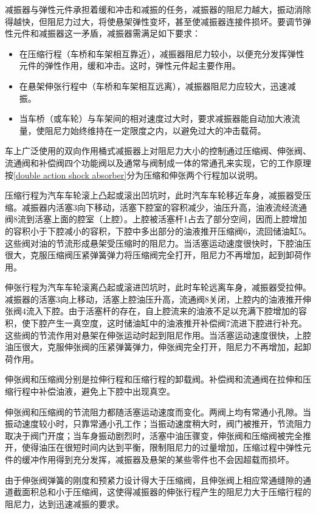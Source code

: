 \documentclass[UTF8]{ctexart}
\numberwithin{figure}{section}
\numberwithin{table}{section}
\begin{document}
减振器与弹性元件承担着缓和冲击和减振的任务，减振器的阻尼力越大，振动消除得越快，但阻尼力过大，将使悬架弹性变坏，甚至使减振器连接件损坏。要调节弹性元件和减振器这一矛盾，减振器需满足如下要求：
\begin{itemize}
	\item 在压缩行程（车桥和车架相互靠近），减振器阻尼力较小，以便充分发挥弹性元件的弹性作用，缓和冲击。这时，弹性元件起主要作用。
	\item 在悬架伸张行程中（车桥和车架相互远离），减振器阻尼力应较大，迅速减振。
	\item 当车桥（或车轮）与车架间的相对速度过大时，要求减振器能自动加大液流量，使阻尼力始终维持在一定限度之内，以避免过大的冲击载荷。
\end{itemize}

车上广泛使用的双向作用桶式减振器上对阻尼力大小的控制通过压缩阀、伸张阀、流通阀和补偿阀四个功能阀以及通常与阀制成一体的常通孔来实现，它的工作原理按\cref{double action shock absorber}分为压缩和伸张两个行程加以说明。

压缩行程为汽车车轮滚上凸起或滚出凹坑时，此时汽车车轮移近车身，减振器受压缩。减振器内活塞3向下移动，活塞下腔室的容积减少，油压升高，油液流经流通阀8流到活塞上面的腔室（上腔）。上腔被活塞杆1占去了部分空间，因而上腔增加的容积小于下腔减小的容积，下腔中多出部分的油液推开压缩阀6，流回储油缸5。这些阀对油的节流形成悬架受压缩时的阻尼力。当活塞运动速度很快时，下腔油压很大，克服压缩阀压紧弹簧弹力将压缩阀完全打开，阻尼力不再增加，起到卸荷作用。

伸张行程为汽车车轮滚离凸起或滚进凹坑时，此时车轮远离车身，减振器受拉伸。减振器的活塞3向上移动，活塞上腔油压升高，流通阀8关闭，上腔内的油液推开伸张阀4流入下腔。由于活塞杆的存在，自上腔流来的油液不足以充满下腔增加的容积，使下腔产生一真空度，这时储油缸中的油液推开补偿阀7流进下腔进行补充。这些阀的节流作用对悬架在伸张运动时起到阻尼作用。当活塞运动速度很快，上腔油压很大，克服伸张阀的压紧弹簧弹力，伸张阀完全打开，阻尼力不再增加，起卸荷作用。

伸张阀和压缩阀分别是拉伸行程和压缩行程的卸载阀。补偿阀和流通阀在拉伸和压缩行程中补偿油液，避免上下腔中出现真空。

伸张阀和压缩阀的节流阻力都随活塞运动速度而变化。两阀上均有常通小孔隙。当振动速度较小时，只靠常通小孔工作；当振动速度稍大时，阀门被推开，节流阻力取决于阀门开度；当车身振动剧烈时，活塞中油压骤变，伸张阀和压缩阀被完全推开，使得油压在很短时间内达到平衡，限制阻尼力的过量增加，压缩过程中弹性元件的缓冲作用得到充分发挥，减振器及悬架的某些零件也不会因超载而损坏。

由于伸张阀弹簧的刚度和预紧力设计得大于压缩阀，且伸张阀上相应常通缝隙的通道截面积总和小于压缩阀，这使得减振器的伸张行程产生的阻尼力大于压缩行程的阻尼力，达到迅速减振的要求。
\end{document}
